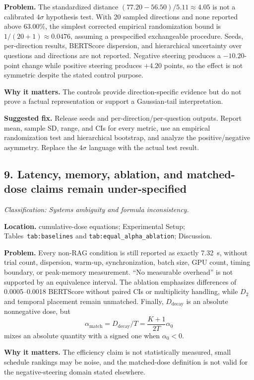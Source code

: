\documentclass[11pt]{article}
\newcommand{\findinglabel}[1]{\textbf{#1}}
\newcommand{\classification}[1]{\textit{Classification: #1.}}
\begin{document}
\findinglabel{Problem.} The standardized distance $(77.20-56.50)/5.11\approx4.05$ is not a calibrated $4\sigma$ hypothesis test.  With 20 sampled directions and none reported above 63.00\%, the simplest corrected empirical randomization bound is $1/(20+1)\approx0.0476$, assuming a prespecified exchangeable procedure.  Seeds, per-direction results, BERTScore dispersion, and hierarchical uncertainty over questions and directions are not reported.  Negative steering produces a $-10.20$-point change while positive steering produces $+4.20$ points, so the effect is not symmetric despite the stated control purpose.

\findinglabel{Why it matters.} The controls provide direction-specific evidence but do not prove a factual representation or support a Gaussian-tail interpretation.

\findinglabel{Suggested fix.} Release seeds and per-direction/per-question outputs.  Report mean, sample SD, range, and CIs for every metric, use an empirical randomization test and hierarchical bootstrap, and analyze the positive/negative asymmetry.  Replace the $4\sigma$ language with the actual test result.

\subsection*{9. Latency, memory, ablation, and matched-dose claims remain under-specified}

\classification{Systems ambiguity and formula inconsistency}

\findinglabel{Location.} cumulative-dose equations; Experimental Setup; Tables~\texttt{tab:baselines} and \texttt{tab:equal\_alpha\_ablation}; Discussion.

\findinglabel{Problem.} Every non-RAG condition is still reported as exactly 7.32~s, without trial count, dispersion, warm-up, synchronization, batch size, GPU count, timing boundary, or peak-memory measurement.  ``No measurable overhead'' is not supported by an equivalence interval.  The ablation emphasizes differences of 0.0005--0.0018 BERTScore without paired CIs or multiplicity handling, while $D_2$ and temporal placement remain unmatched.  Finally, $D_{\text{decay}}$ is an absolute nonnegative dose, but
\[
\alpha_{\text{match}}=D_{\text{decay}}/T
=\frac{K+1}{2T}\alpha_0
\]
mixes an absolute quantity with a signed one when $\alpha_0<0$.

\findinglabel{Why it matters.} The efficiency claim is not statistically measured, small schedule rankings may be noise, and the matched-dose definition is not valid for the negative-steering domain stated elsewhere.
\end{document}

